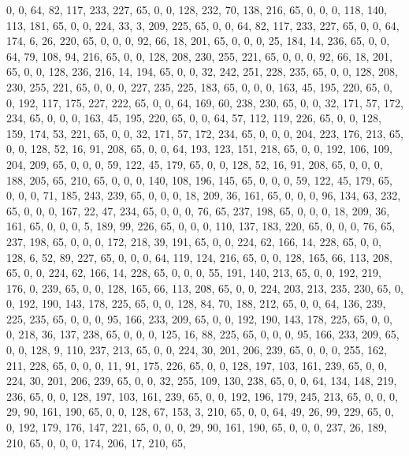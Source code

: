 \begin{DoxyCode}
       0, 0, 64, 82, 117, 233, 227, 65, 0, 0, 128, 232, 70, 138, 216, 65, 0, 0, 0, 118, 140, 113, 181, 65, 0, 0,
       224, 33, 3, 209, 225, 65, 0, 0, 64, 82, 117, 233, 227, 65, 0, 0, 64, 174, 6, 26, 220, 65, 0, 0, 0, 92, 66, 18,
       201, 65, 0, 0, 0, 25, 184, 14, 236, 65, 0, 0, 64, 79, 108, 94, 216, 65, 0, 0, 128, 208, 230, 255, 221, 65,
       0, 0, 0, 92, 66, 18, 201, 65, 0, 0, 128, 236, 216, 14, 194, 65, 0, 0, 32, 242, 251, 228, 235, 65, 0, 0, 128,
       208, 230, 255, 221, 65, 0, 0, 0, 227, 235, 225, 183, 65, 0, 0, 0, 163, 45, 195, 220, 65, 0, 0, 192, 117,
       175, 227, 222, 65, 0, 0, 64, 169, 60, 238, 230, 65, 0, 0, 32, 171, 57, 172, 234, 65, 0, 0, 0, 163, 45, 195,
       220, 65, 0, 0, 64, 57, 112, 119, 226, 65, 0, 0, 128, 159, 174, 53, 221, 65, 0, 0, 32, 171, 57, 172, 234, 65, 0,
       0, 0, 204, 223, 176, 213, 65, 0, 0, 128, 52, 16, 91, 208, 65, 0, 0, 64, 193, 123, 151, 218, 65, 0, 0, 192,
       106, 109, 204, 209, 65, 0, 0, 0, 59, 122, 45, 179, 65, 0, 0, 128, 52, 16, 91, 208, 65, 0, 0, 0, 188, 205,
       65, 210, 65, 0, 0, 0, 140, 108, 196, 145, 65, 0, 0, 0, 59, 122, 45, 179, 65, 0, 0, 0, 71, 185, 243, 239, 65,
       0, 0, 0, 18, 209, 36, 161, 65, 0, 0, 0, 96, 134, 63, 232, 65, 0, 0, 0, 167, 22, 47, 234, 65, 0, 0, 0, 76, 65,
       237, 198, 65, 0, 0, 0, 18, 209, 36, 161, 65, 0, 0, 0, 5, 189, 99, 226, 65, 0, 0, 0, 110, 137, 183, 220, 65,
       0, 0, 0, 76, 65, 237, 198, 65, 0, 0, 0, 172, 218, 39, 191, 65, 0, 0, 224, 62, 166, 14, 228, 65, 0, 0, 128,
       6, 52, 89, 227, 65, 0, 0, 0, 64, 119, 124, 216, 65, 0, 0, 128, 165, 66, 113, 208, 65, 0, 0, 224, 62, 166,
       14, 228, 65, 0, 0, 0, 55, 191, 140, 213, 65, 0, 0, 192, 219, 176, 0, 239, 65, 0, 0, 128, 165, 66, 113, 208,
       65, 0, 0, 224, 203, 213, 235, 230, 65, 0, 0, 192, 190, 143, 178, 225, 65, 0, 0, 128, 84, 70, 188, 212, 65, 0,
       0, 64, 136, 239, 225, 235, 65, 0, 0, 0, 95, 166, 233, 209, 65, 0, 0, 192, 190, 143, 178, 225, 65, 0, 0, 0,
       218, 36, 137, 238, 65, 0, 0, 0, 125, 16, 88, 225, 65, 0, 0, 0, 95, 166, 233, 209, 65, 0, 0, 128, 9, 110, 237,
       213, 65, 0, 0, 224, 30, 201, 206, 239, 65, 0, 0, 0, 255, 162, 211, 228, 65, 0, 0, 0, 11, 91, 175, 226, 65,
       0, 0, 128, 197, 103, 161, 239, 65, 0, 0, 224, 30, 201, 206, 239, 65, 0, 0, 32, 255, 109, 130, 238, 65, 0, 0,
       64, 134, 148, 219, 236, 65, 0, 0, 128, 197, 103, 161, 239, 65, 0, 0, 192, 196, 179, 245, 213, 65, 0, 0, 0,
       29, 90, 161, 190, 65, 0, 0, 128, 67, 153, 3, 210, 65, 0, 0, 64, 49, 26, 99, 229, 65, 0, 0, 192, 179, 176,
       147, 221, 65, 0, 0, 0, 29, 90, 161, 190, 65, 0, 0, 0, 237, 26, 189, 210, 65, 0, 0, 0, 174, 206, 17, 210, 65,

\end{DoxyCode}
